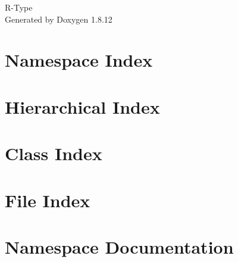 \documentclass[twoside]{book}
\newcommand{\+}{\discretionary{\mbox{\scriptsize$\hookleftarrow$}}{}{}}
\newcommand{\clearemptydoublepage}{%
  \newpage{\pagestyle{empty}\cleardoublepage}%
}
\begin{document}
\begin{titlepage}
\vspace*{7cm}
\begin{center}%
{\Large R-\/\+Type }\\
\vspace*{1cm}
{\large Generated by Doxygen 1.8.12}\\
\end{center}
\end{titlepage}
\clearemptydoublepage
{}
\tableofcontents
\clearemptydoublepage
{}

\chapter{Namespace Index}

\chapter{Hierarchical Index}

\chapter{Class Index}

\chapter{File Index}

\chapter{Namespace Documentation}







\end{document}
